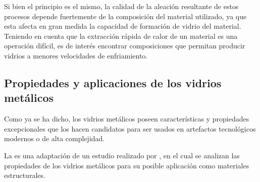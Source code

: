 Si bien el principio es el mismo, la calidad de la aleación resultante de estos procesos depende fuertemente de la composición del material utilizado, ya que esta afecta en gran medida la capacidad de formación de vidrio del material. Teniendo en cuenta que la extracción rápida de calor de un material es una operación difícil, es de interés encontrar composiciones que permitan producir vidrios a menores velocidades de enfriamiento.

\subsection{Propiedades y aplicaciones de los vidrios metálicos}
\label{S1_1_2}

Como ya se ha dicho, los vidrios metálicos poseen características y propiedades excepcionales que los hacen candidatos para ser usados en artefactos tecnológicos modernos o de alta complejidad.

La  es una adaptación de un estudio realizado por \cite{ashby06}, en el cual se analizan las propiedades de los vidrios metálicos para su posible aplicación como materiales estructurales.

